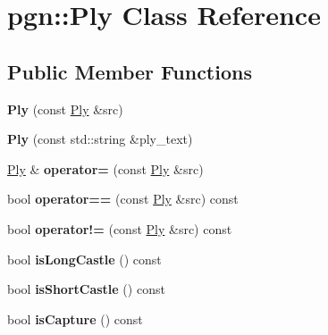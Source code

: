 \hypertarget{classpgn_1_1Ply}{
\section{pgn::Ply Class Reference}
\label{classpgn_1_1Ply}
}
\subsection*{Public Member Functions}
\begin{DoxyCompactItemize}
\item 
\hypertarget{classpgn_1_1Ply_aed26da0eafcb47e74ec80413bfe812d2}{
{\bfseries Ply} (const \hyperlink{classpgn_1_1Ply}{Ply} \&src)}
\label{classpgn_1_1Ply_aed26da0eafcb47e74ec80413bfe812d2}

\item 
\hypertarget{classpgn_1_1Ply_af9105fdc769d5e28e78b6713b591a26f}{
{\bfseries Ply} (const std::string \&ply\_\-text)}
\label{classpgn_1_1Ply_af9105fdc769d5e28e78b6713b591a26f}

\item 
\hypertarget{classpgn_1_1Ply_a2bd416f02a015a5c4a30e3992a1e8dc9}{
\hyperlink{classpgn_1_1Ply}{Ply} \& {\bfseries operator=} (const \hyperlink{classpgn_1_1Ply}{Ply} \&src)}
\label{classpgn_1_1Ply_a2bd416f02a015a5c4a30e3992a1e8dc9}

\item 
\hypertarget{classpgn_1_1Ply_a995c0362b3de149a285585eccd7b6893}{
bool {\bfseries operator==} (const \hyperlink{classpgn_1_1Ply}{Ply} \&src) const }
\label{classpgn_1_1Ply_a995c0362b3de149a285585eccd7b6893}

\item 
\hypertarget{classpgn_1_1Ply_a57bbef4d69303dbed338d6b3465ded21}{
bool {\bfseries operator!=} (const \hyperlink{classpgn_1_1Ply}{Ply} \&src) const }
\label{classpgn_1_1Ply_a57bbef4d69303dbed338d6b3465ded21}

\item 
\hypertarget{classpgn_1_1Ply_a510f52389e06454f6187ce3dbd4415ea}{
bool {\bfseries isLongCastle} () const }
\label{classpgn_1_1Ply_a510f52389e06454f6187ce3dbd4415ea}

\item 
\hypertarget{classpgn_1_1Ply_a990edff208883efc0347664530e1a590}{
bool {\bfseries isShortCastle} () const }
\label{classpgn_1_1Ply_a990edff208883efc0347664530e1a590}

\item 
\hypertarget{classpgn_1_1Ply_a0e5adc12ff755af200466885a5158154}{
bool {\bfseries isCapture} () const }
\label{classpgn_1_1Ply_a0e5adc12ff755af200466885a5158154}


\end{DoxyCompactItemize}
